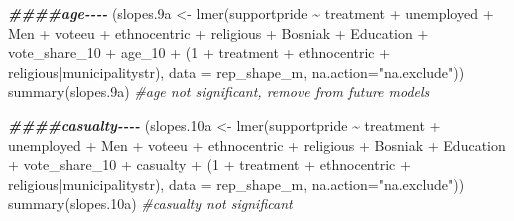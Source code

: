 \documentclass[
]{article}
\newenvironment{Shaded}{\begin{snugshade}}{\end{snugshade}}
\newcommand{\AttributeTok}[1]{\textcolor[rgb]{0.77,0.63,0.00}{#1}}
\newcommand{\CommentTok}[1]{\textcolor[rgb]{0.56,0.35,0.01}{\textit{#1}}}
\newcommand{\DecValTok}[1]{\textcolor[rgb]{0.00,0.00,0.81}{#1}}
\newcommand{\DocumentationTok}[1]{\textcolor[rgb]{0.56,0.35,0.01}{\textbf{\textit{#1}}}}
\newcommand{\FloatTok}[1]{\textcolor[rgb]{0.00,0.00,0.81}{#1}}
\newcommand{\FunctionTok}[1]{\textcolor[rgb]{0.00,0.00,0.00}{#1}}
\newcommand{\NormalTok}[1]{#1}
\newcommand{\OtherTok}[1]{\textcolor[rgb]{0.56,0.35,0.01}{#1}}
\newcommand{\SpecialCharTok}[1]{\textcolor[rgb]{0.00,0.00,0.00}{#1}}
\newcommand{\StringTok}[1]{\textcolor[rgb]{0.31,0.60,0.02}{#1}}
\begin{document}
\begin{Shaded}
\begin{Highlighting}[]
\DocumentationTok{\#\#\#\#age{-}{-}{-}{-}}
\NormalTok{(slopes}\FloatTok{.9}\NormalTok{a }\OtherTok{\textless{}{-}} \FunctionTok{lmer}\NormalTok{(supportpride }\SpecialCharTok{\textasciitilde{}}\NormalTok{ treatment }\SpecialCharTok{+}\NormalTok{ unemployed }\SpecialCharTok{+}\NormalTok{ Men }\SpecialCharTok{+}\NormalTok{ voteeu }\SpecialCharTok{+}\NormalTok{ ethnocentric }\SpecialCharTok{+}\NormalTok{ religious }\SpecialCharTok{+} 
\NormalTok{                     Bosniak }\SpecialCharTok{+}\NormalTok{ Education }\SpecialCharTok{+}\NormalTok{ vote\_share\_10 }\SpecialCharTok{+}\NormalTok{ age\_10 }\SpecialCharTok{+}\NormalTok{ (}\DecValTok{1} \SpecialCharTok{+}\NormalTok{ treatment }\SpecialCharTok{+}\NormalTok{ ethnocentric }\SpecialCharTok{+}\NormalTok{ religious}\SpecialCharTok{|}\NormalTok{municipalitystr),}
                   \AttributeTok{data =}\NormalTok{ rep\_shape\_m, }\AttributeTok{na.action=}\StringTok{"na.exclude"}\NormalTok{))}
\FunctionTok{summary}\NormalTok{(slopes}\FloatTok{.9}\NormalTok{a) }\CommentTok{\#age not significant, remove from future models}

\DocumentationTok{\#\#\#\#casualty{-}{-}{-}{-}}
\NormalTok{(slopes}\FloatTok{.10}\NormalTok{a }\OtherTok{\textless{}{-}} \FunctionTok{lmer}\NormalTok{(supportpride }\SpecialCharTok{\textasciitilde{}}\NormalTok{ treatment }\SpecialCharTok{+}\NormalTok{ unemployed }\SpecialCharTok{+}\NormalTok{ Men }\SpecialCharTok{+}\NormalTok{ voteeu }\SpecialCharTok{+}\NormalTok{ ethnocentric }\SpecialCharTok{+}\NormalTok{ religious }\SpecialCharTok{+} 
\NormalTok{                      Bosniak }\SpecialCharTok{+}\NormalTok{ Education }\SpecialCharTok{+}\NormalTok{ vote\_share\_10 }\SpecialCharTok{+}\NormalTok{ casualty }\SpecialCharTok{+}\NormalTok{ (}\DecValTok{1} \SpecialCharTok{+}\NormalTok{ treatment }\SpecialCharTok{+}\NormalTok{ ethnocentric }\SpecialCharTok{+}\NormalTok{ religious}\SpecialCharTok{|}\NormalTok{municipalitystr),}
                    \AttributeTok{data =}\NormalTok{ rep\_shape\_m, }\AttributeTok{na.action=}\StringTok{"na.exclude"}\NormalTok{))}
\FunctionTok{summary}\NormalTok{(slopes}\FloatTok{.10}\NormalTok{a) }\CommentTok{\#casualty not significant}


\end{Highlighting}
\end{Shaded}
\end{document}
